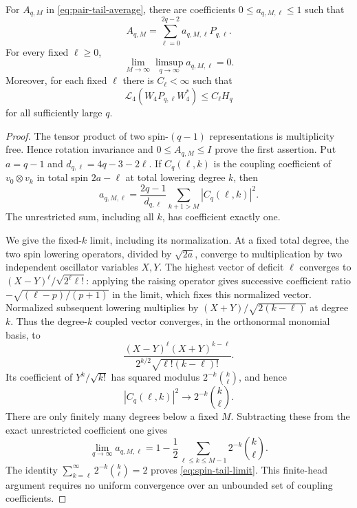 \begin{lemma}\label{lem:pair-spin-tail}
For $A_{q,M}$ in \eqref{eq:pair-tail-average}, there are coefficients
$0\le a_{q,M,\ell}\le1$ such that
\[
 A_{q,M}=\sum_{\ell=0}^{2q-2}a_{q,M,\ell}P_{q,\ell}.
\]
For every fixed $\ell\ge0$,
\begin{equation}\label{eq:spin-tail-limit}
 \lim_{M\to\infty}\limsup_{q\to\infty}a_{q,M,\ell}=0.
\end{equation}
Moreover, for each fixed $\ell$ there is $C_\ell<\infty$ such that
\begin{equation}\label{eq:fixed-block-energy}
 \mathcal L_4(W_4P_{q,\ell}W_4^*)\le C_\ell H_q
\end{equation}
for all sufficiently large $q$.
\end{lemma}
\begin{proof}
The tensor product of two spin-$(q-1)$ representations is multiplicity
free.  Hence rotation invariance and $0\le A_{q,M}\le I$ prove the first
assertion.  Put $a=q-1$ and $d_{q,\ell}=4q-3-2\ell$.
If $C_{q}(\ell,k)$ is the coupling coefficient of $v_0\otimes v_k$ in
total spin $2a-\ell$ at total lowering degree $k$, then
\begin{equation}\label{eq:spin-tail-coefficient}
 a_{q,M,\ell}=\frac{2q-1}{d_{q,\ell}}
                    \sum_{k+1>M}|C_q(\ell,k)|^2.
\end{equation}
The unrestricted sum, including all $k$, has coefficient exactly one.

We give the fixed-$k$ limit, including its normalization.  At a fixed
total degree, the two spin lowering operators, divided by $\sqrt{2a}$,
converge to multiplication by two independent oscillator variables
$X,Y$.  The highest vector of deficit $\ell$ converges to
$(X-Y)^\ell/\sqrt{2^\ell\ell!}$: applying the raising operator gives
successive coefficient ratio
$-\sqrt{(\ell-p)/(p+1)}$ in the limit, which fixes this normalized vector.
Normalized subsequent lowering multiplies by
$(X+Y)/\sqrt{2(k-\ell)}$ at degree $k$.  Thus the degree-$k$ coupled
vector converges, in the orthonormal monomial basis, to
\[
 \frac{(X-Y)^\ell(X+Y)^{k-\ell}}
      {2^{k/2}\sqrt{\ell!(k-\ell)!}}.
\]
Its coefficient of $Y^k/\sqrt{k!}$ has squared modulus
$2^{-k}\binom{k}{\ell}$, and hence
\[
 |C_q(\ell,k)|^2\longrightarrow2^{-k}\binom{k}{\ell}.
\]
There are only finitely many degrees below a fixed $M$.  Subtracting
these from the exact unrestricted coefficient one gives
\[
 \lim_{q\to\infty}a_{q,M,\ell}
 =1-\frac12\sum_{\ell\le k\le M-1}2^{-k}\binom{k}{\ell}.
\]
The identity
$\sum_{k=\ell}^{\infty}2^{-k}\binom{k}{\ell}=2$
proves \eqref{eq:spin-tail-limit}.  This finite-head argument requires no
uniform convergence over an unbounded set of coupling coefficients.


\end{proof}
